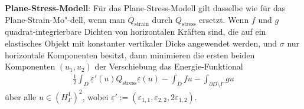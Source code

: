 \textbf{Plane-Stress-Modell}:
Für das Plane-Stress-Modell gilt dasselbe wie für das Plane-Strain-Mo"-dell,
wenn man $Q_{\text{strain}}$ durch $Q_{\text{stress}}$ ersetzt.
Wenn $f$ und $g$ quadrat-integrierbare Dichten von horizontalen Kräften sind,
die auf ein elastisches Objekt mit konstanter vertikaler Dicke angewendet werden,
und $\sigma$ nur horizontale Komponenten besitzt, dann
minimieren die ersten beiden Komponenten $(u_1, u_2)$ der Verschiebung das Energie-Funktional
\begin{align*}
    \frac{1}{2} \int_D \underline{\varepsilon}'(u) Q_{\text{stress}} \underline{\varepsilon}(u) -
    \int_D fu - \int_{\partial D \setminus \Gamma} gu
\end{align*}
über alle $u \in (H_\Gamma^1)^2$, wobei
$\underline{\varepsilon}' := (\varepsilon_{1,1}, \varepsilon_{2,2}, 2\varepsilon_{1,2})$.

\pagebreak
